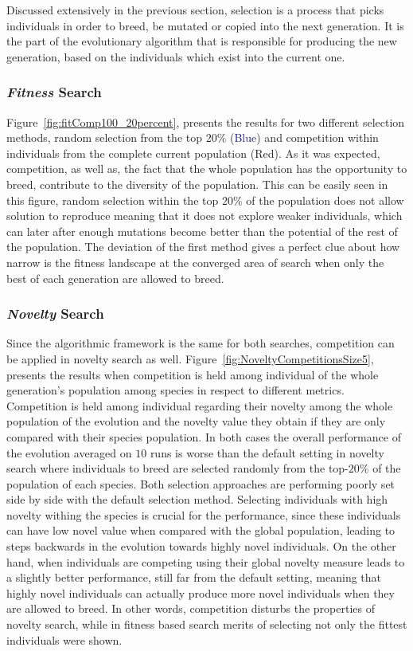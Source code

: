 Discussed extensively in the previous section, selection is a process that picks individuals in order to breed, be mutated or copied into the next generation. It is the part of the evolutionary algorithm that is responsible for producing the new generation, based on the individuals which exist into the current one.


\subsubsection*{\emph{Fitness} Search}

Figure~\ref{fig:fitComp100_20percent}, presents the results for two different selection methods, random selection from the top $20\%$ (\textcolor{MidnightBlue}{Blue}) and competition within individuals from the complete current population (\textcolor{BrickRed}{Red}). As it was expected, competition, as well as, the fact that the whole population has the opportunity to breed, contribute to the diversity of the population. This can be easily seen in this figure, random selection within the top $20\%$ of the population does not allow solution to reproduce meaning that it does not explore weaker individuals, which can later after enough mutations become better than the potential of the rest of the population. The deviation of the first method gives a perfect clue about how narrow is the fitness landscape at the converged area of search when only the best of each generation are allowed to breed.

\subsubsection*{\emph{Novelty} Search}

Since the algorithmic framework is the same for both searches, competition can be applied in novelty search as well. Figure~\ref{fig:NoveltyCompetitionsSize5}, presents the results when competition is held among individual of the whole generation's population among species in respect to different metrics. Competition is held among individual regarding their novelty among the whole population of the evolution and the novelty value they obtain if they are only compared with their species population. In both cases the overall performance of the evolution averaged on $10$ runs is worse than the default setting in novelty search where individuals to breed are selected randomly from the top-$20\%$ of the population of each species. Both selection approaches are performing poorly set side by side with the default selection method. Selecting individuals with high novelty withing the species is crucial for the performance, since these individuals can have low novel value when compared with the global population, leading to steps backwards in the evolution towards highly novel individuals. On the other hand, when individuals are competing using their global novelty measure leads to a slightly better performance, still far from the default setting, meaning that highly novel individuals can actually produce more novel individuals when they are allowed to breed. In other words, competition disturbs  the properties of novelty search, while in fitness based search merits of selecting not only the fittest individuals were shown.


